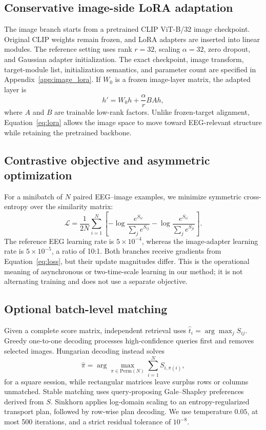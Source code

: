 \documentclass{article}
\begin{document}
\subsection{Conservative image-side LoRA adaptation}

The image branch starts from a pretrained CLIP ViT-B/32 image checkpoint. Original CLIP weights remain frozen, and LoRA adapters are inserted into linear modules. The reference setting uses rank $r=32$, scaling $\alpha=32$, zero dropout, and Gaussian adapter initialization. The exact checkpoint, image transform, target-module list, initialization semantics, and parameter count are specified in Appendix~\ref{app:image_lora}. If $W_0$ is a frozen image-layer matrix, the adapted layer is
\begin{equation}
h'=W_0h+\frac{\alpha}{r}BAh,
\label{eq:lora}
\end{equation}
where $A$ and $B$ are trainable low-rank factors. Unlike frozen-target alignment, Equation~\ref{eq:lora} allows the image space to move toward EEG-relevant structure while retaining the pretrained backbone.

\subsection{Contrastive objective and asymmetric optimization}

For a minibatch of $N$ paired EEG--image examples, we minimize symmetric cross-entropy over the similarity matrix:
\begin{equation}
\mathcal{L}=\frac{1}{2N}\sum_{i=1}^{N}
\left[-\log\frac{e^{S_{ii}}}{\sum_j e^{S_{ij}}}
-\log\frac{e^{S_{ii}}}{\sum_j e^{S_{ji}}}\right].
\label{eq:loss}
\end{equation}
The reference EEG learning rate is $5\times10^{-4}$, whereas the image-adapter learning rate is $5\times10^{-5}$, a ratio of 10:1. Both branches receive gradients from Equation~\ref{eq:loss}, but their update magnitudes differ. This is the operational meaning of asynchronous or two-time-scale learning in our method; it is not alternating training and does not use a separate objective.

\subsection{Optional batch-level matching}
\label{sec:matching_method}

Given a complete score matrix, independent retrieval uses $\hat{t}_i=\arg\max_jS_{ij}$. Greedy one-to-one decoding processes high-confidence queries first and removes selected images. Hungarian decoding instead solves
\begin{equation}
\hat{\pi}=\arg\max_{\pi\in\mathrm{Perm}(N)}\sum_{i=1}^{N}S_{i,\pi(i)},
\label{eq:hungarian}
\end{equation}
for a square session, while rectangular matrices leave surplus rows or columns unmatched. Stable matching uses query-proposing Gale--Shapley preferences derived from $S$. Sinkhorn applies log-domain scaling to an entropy-regularized transport plan, followed by row-wise plan decoding. We use temperature $0.05$, at most 500 iterations, and a strict residual tolerance of $10^{-8}$.
\end{document}
